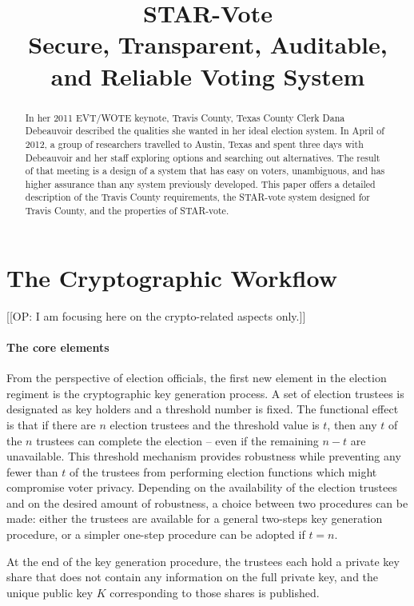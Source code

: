 \documentclass[letterpaper, 10pt, twocolumn]{article}
\title{STAR-Vote \\
Secure, Transparent, Auditable, and Reliable Voting System}
\newcommand{\COP}[1]{\textsf{[[OP: #1]]}}
\begin{document}
\maketitle

\begin{abstract}
  In her 2011 EVT/WOTE keynote, Travis County, Texas County Clerk Dana
  Debeauvoir described the qualities she wanted in her ideal election
  system. In April of 2012, a group of researchers travelled to
  Austin, Texas and spent three days with Debeauvoir and her staff
  exploring options and searching out alternatives. The result of that
  meeting is a design of a system that has easy on voters,
  unambiguous, and has higher assurance than any system previously
  developed. This paper offers a detailed description of the Travis
  County requirements, the STAR-vote system designed for Travis
  County, and the properties of STAR-vote.
\end{abstract}


\section{The Cryptographic Workflow}
\label{sec:crypto}

\COP{I am focusing here on the crypto-related aspects only.}

\paragraph{The core elements}
\label{sec:crypto-core}

From the perspective of election officials, the first new element in
the election regiment is the cryptographic key generation process. A
set of election trustees is designated as key holders and a threshold
number is fixed. The functional effect is that if there are $n$
election trustees and the threshold value is $t$, then any $t$ of the
$n$ trustees can complete the election – even if the remaining $n-t$
are unavailable. This threshold mechanism provides robustness while
preventing any fewer than $t$ of the trustees from performing election
functions which might compromise voter privacy. Depending on the
availability of the election trustees and on the desired amount of
robustness, a choice between two procedures can be made: either the
trustees are available for a general two-steps key generation
procedure, or a simpler one-step procedure can be adopted if $t=n$.

At the end of the key generation procedure, the trustees each hold a
private key share that does not contain any information on the full
private key, and the unique public key $K$ corresponding to those
shares is published.
\end{document}
